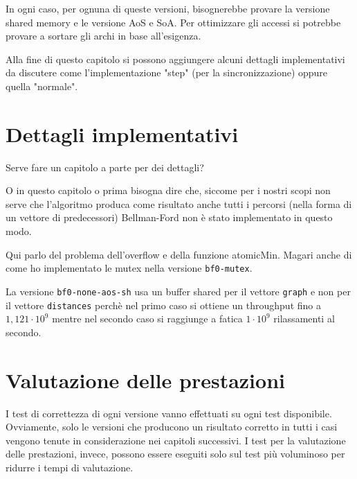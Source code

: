 \documentclass{article}
\begin{document}
	In ogni caso, per ognuna di queste versioni, bisognerebbe provare la versione shared memory e le versione AoS e SoA. Per ottimizzare gli accessi si potrebbe provare a sortare gli archi in base all'esigenza.
	
	Alla fine di questo capitolo si possono aggiungere alcuni dettagli implementativi da discutere come l'implementazione "step" (per la sincronizzazione) oppure quella "normale".
	
	\section{Dettagli implementativi}
	\label{section:impl}
	Serve fare un capitolo a parte per dei dettagli?
	
	O in questo capitolo o prima bisogna dire che, siccome per i nostri scopi non serve che l'algoritmo produca come risultato anche tutti i percorsi (nella forma di un vettore di predecessori) Bellman-Ford non è stato implementato in questo modo.
	
	Qui parlo del problema dell'overflow e della funzione atomicMin. Magari anche di come ho implementato le mutex nella versione \texttt{bf0-mutex}.
	
	La versione \texttt{bf0-none-aos-sh} usa un buffer shared per il vettore \texttt{graph} e non per il vettore \texttt{distances} perchè nel primo caso si ottiene un throughput fino a $1,121\cdot 10^9$ mentre nel secondo caso si raggiunge a fatica $1\cdot 10^9$ rilassamenti al secondo.
	
	\section{Valutazione delle prestazioni}
	\label{section:perf}
	I test di correttezza di ogni versione vanno effettuati su ogni test disponibile. Ovviamente, solo le versioni che producono un risultato corretto in tutti i casi vengono tenute in considerazione nei capitoli successivi. I test per la valutazione delle prestazioni, invece, possono essere eseguiti solo sul test più voluminoso per ridurre i tempi di valutazione.
	
\end{document}
